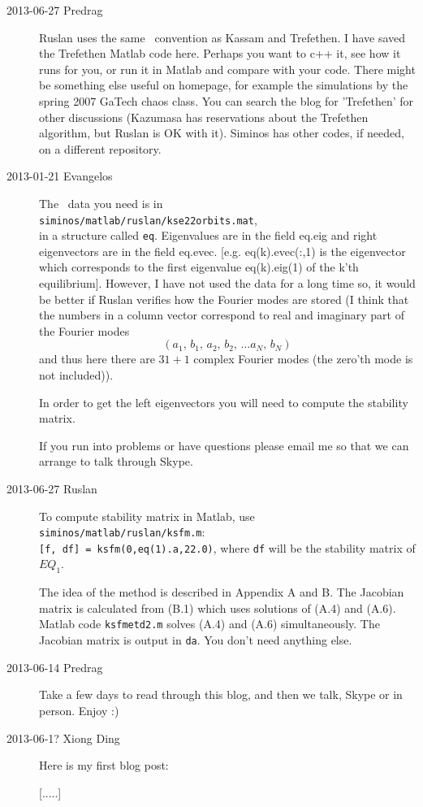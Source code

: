 \begin{description}
\item[2013-06-27 Predrag]
Ruslan uses the same \KSe\ convention as Kassam and
Trefethen. I have saved the Trefethen Matlab code
 {here}. Perhaps
you want to c++ it, see how it runs for you, or run it in Matlab and
compare with your code. There might be something else useful on
 homepage,
for example the simulations by the spring 2007 GaTech chaos class.
You can search the blog for 'Trefethen' for other discussions
(Kazumasa has reservations about the Trefethen algorithm,
but Ruslan is OK with it).
Siminos has other codes, if needed, on a different repository.

\item[2013-01-21 Evangelos] The \KS\ data you need is in \\
\texttt{siminos/matlab/ruslan/kse22orbits.mat},
\\
in a structure called \texttt{eq}.
Eigenvalues are in the field eq.eig and right
eigenvectors are in the field eq.evec. [e.g. eq(k).evec(:,1) is the
eigenvector which corresponds to the first eigenvalue eq(k).eig(1) of
the k'th equilibrium]. However, I have not used the data for a long
time so, it would be better if Ruslan verifies how the Fourier modes
are stored (I think that the numbers in a column vector correspond to
real and imaginary part of the Fourier modes
\[
 (a_1,\, b_1,\, a_2,\, b_2,\, \ldots a_N,\, b_N)
\]
and thus here there are $31+1$ complex Fourier modes (the zero'th mode
is not included)).

In order to get the left eigenvectors you will need to compute the
stability matrix.

If you run into problems or have questions please email me so that we
can arrange to talk through Skype.


\item[2013-06-27 Ruslan] To compute stability matrix in Matlab, use
\\
\texttt{siminos/matlab/ruslan/ksfm.m}:
\\ {\tt [f, df] = ksfm(0,eq(1).a,22.0)},
where {\tt df} will be the stability matrix of $EQ_1$.

The idea of the method is described in  Appendix A and
B.  The Jacobian matrix is calculated from (B.1) which uses solutions
of (A.4) and (A.6).  Matlab code {\tt ksfmetd2.m} solves (A.4) and
(A.6) simultaneously.  The Jacobian matrix is output in {\tt da}.
You don't need anything else.

\item[2013-06-14 Predrag]
Take a few days to read through this blog, and then we talk,
Skype or in person.
Enjoy :)

\item[2013-06-1? Xiong Ding] Here is my first blog post:

[.....]


\end{description}

\renewcommand{\ssp}{a}
